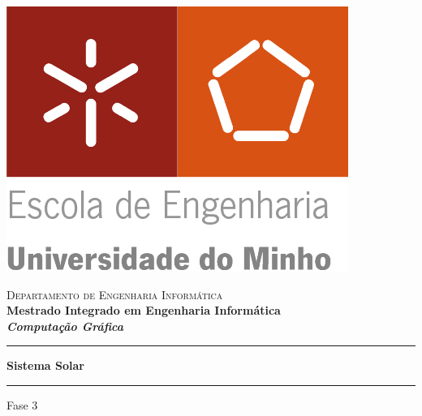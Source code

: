 \begin{titlepage}


\begin{minipage}{0.3\textwidth}
\begin{flushleft} 
\includegraphics[width=\textwidth]{logo.png}
\end{flushleft}
\end{minipage}
\begin{minipage}{0.6\textwidth}
\begin{flushright} 

\textsc{Departamento de Engenharia Informática}\\[0.1cm]
\bfseries Mestrado Integrado em Engenharia Informática \\ [0.1cm]
\bfseries \textit{Computação Gráfica}\\[8mm]

\end{flushright}
\end{minipage}


\vspace{3cm}

\begin{center}
	
\rule{6cm}{0.6pt}\par
\vspace{0.5cm}
\textbf{\Huge Sistema Solar }\par\vspace{0.5\baselineskip}
\rule[0.5\baselineskip]{8cm}{0.6pt}
\vspace{1.5cm}


\LARGE Fase 3


\end{center}
\end{titlepage}
